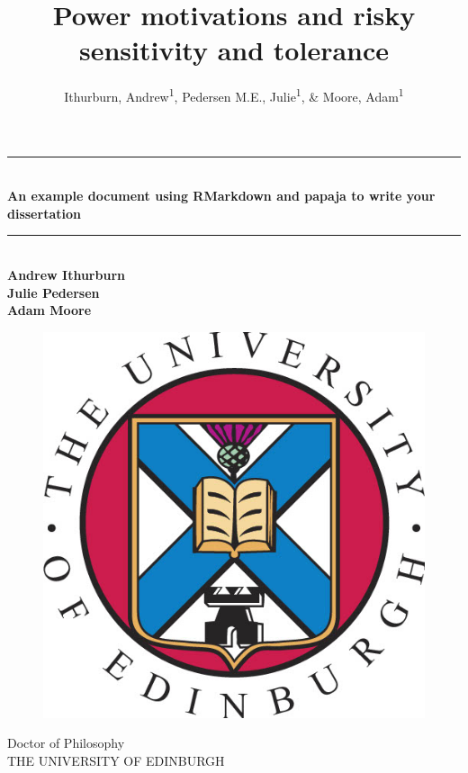 \documentclass[
  english,
  ,doc, 12pt, a4paper,floatsintext]{apa7}
\title{Power motivations and risky sensitivity and tolerance}
\author{Ithurburn, Andrew\textsuperscript{1}, Pedersen M.E., Julie\textsuperscript{1}, \& Moore, Adam\textsuperscript{1}}
\date{}
\affiliation{\vspace{0.5cm}\textsuperscript{1} The University of Edinburgh}
\begin{document}
\maketitle

\newpage

\clearpage

\mbox{}\thispagestyle{empty}\clearpage
\setcounter{page}{1}
\thispagestyle{empty}

\begin{center}
\vspace*{10mm}
\rule{\linewidth}{0.25mm}\\
\textbf{\Large An example document using RMarkdown and papaja to write your dissertation}\\
\rule{\linewidth}{0.25mm}\\
\vspace*{10mm}
\textbf{Andrew Ithurburn}\\
\textbf{Julie Pedersen}\\
\textbf{Adam Moore}\\
\begin{figure}[ht]
\begin{center}
\includegraphics[width=!,totalheight=!,scale=0.25]{EdUniCrest.jpg}
\end{center}
\end{figure}
{ 
Doctor of Philosophy\\
\smallskip
\smallskip
THE UNIVERSITY OF EDINBURGH\\
\smallskip
}
\end{center}
\clearpage
\end{document}
